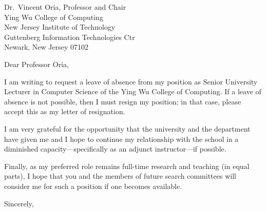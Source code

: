 \documentclass[10pt]{letter} %
\begin{document}

\begin{letter}{
    Dr.~Vincent Oria, Professor and Chair\\
    Ying Wu College of Computing\\
    New Jersey Institute of Technology\\
    Guttenberg Information Technologies Ctr\\
    Newark, New Jersey 07102
  } %

\opening{Dear Professor Oria,}

I am writing to request a leave of absence from my position as Senior University Lecturer in Computer Science of the Ying Wu College of Computing.  If a leave of absence is not possible, then I must resign my position; in that case, please accept this as my letter of resignation.

I am very grateful for the opportunity that the university and the department have given me and I hope to continue my relationship with the school in a diminished capacity---specifically as an adjunct instructor---if possible.

Finally, as my preferred role remains full-time research and teaching (in equal parts), I hope that you and the members of future search committees will consider me for such a position if one becomes available.

\vspace{2\parskip} %
\closing{Sincerely,}
\vspace{2\parskip} %




\end{letter}
 
\end{document}

